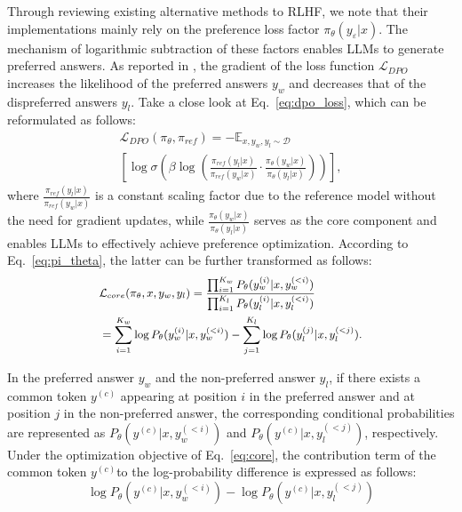Through reviewing existing alternative methods to RLHF, we note that their implementations mainly rely on the preference loss factor $\pi_{\theta}(y_\varepsilon|x)$. The mechanism of logarithmic subtraction of these factors enables LLMs to generate preferred answers. As reported in \cite{rafailov2023direct}, the gradient of the loss function $\mathcal{L}_{DPO}$ increases the likelihood of the preferred answers $y_w$ and decreases that of the dispreferred answers $y_l$. Take a close look at Eq.~\ref{eq:dpo_loss}, which can be reformulated as follows:
\begin{equation}
\begin{split}
    \mathcal{L}_{DPO}(\pi_{\theta},\pi_{ref})= -\mathbb{E}_{x,y_w,y_l\sim \mathcal{D}} \\ \left [ \log \sigma (\beta \log (\frac{\pi_{ref}(y_l|x) }{\pi_{ref}(y_w|x)}\cdot \frac{\pi_{\theta }(y_w|x) }{\pi_{\theta }(y_l|x)})) \right ], 
\end{split}
    \label{eq:dpo_2}
\end{equation}
\noindent where $\frac{\pi_{ref}(y_l|x)}{\pi_{ref}(y_w|x)}$ is a constant scaling factor due to the reference model without the need for gradient updates, while $\frac{\pi_{\theta }(y_w|x) }{\pi_{\theta }(y_l|x)}$ serves as the core component and enables LLMs to effectively achieve preference optimization. According to Eq.~\ref{eq:pi_theta}, the latter can be further transformed as follows:
\begin{equation}
\small
\label{eq:core}
\begin{aligned}
&\mathcal{L}_{core}(\pi_\theta,x,y_w,y_l) =\frac{\prod_{i=1}^{K_w}P_{\theta }(y_w^{(i)}|x,y_w^{(<i)}) }{\prod_{i=1}^{K_l}P_{\theta }(y_l^{(i)}|x,y_l^{(<i)}) } \\
&=\sum_{i=1}^{K_w} \log P_{\theta}(y_w^{(i)}|x, y_w^{(<i)}) - \sum_{j=1}^{K_l} \log P_{\theta}(y_l^{(j)}|x, y_l^{(<j)}).
\end{aligned}
\end{equation}

In the preferred answer $y_w$ and the non-preferred answer $y_l$, if there exists a common token $y^{(c)}$ appearing at position $i$ in the preferred answer and at position $j$ in the non-preferred answer, the corresponding conditional probabilities are represented as $P_{\theta}(y^{(c)} | x, y_w^{(<i)})$ and $P_{\theta}(y^{(c)} | x, y_l^{(<j)})$, respectively. Under the optimization objective of Eq.~\ref{eq:core}, the contribution term of the common token $y^{(c)}$to the log-probability difference is expressed as follows:
\begin{equation}
\log P_{\theta}(y^{(c)} | x, y_w^{(<i)}) - \log P_{\theta}(y^{(c)} | x, y_l^{(<j)})
\end{equation}


